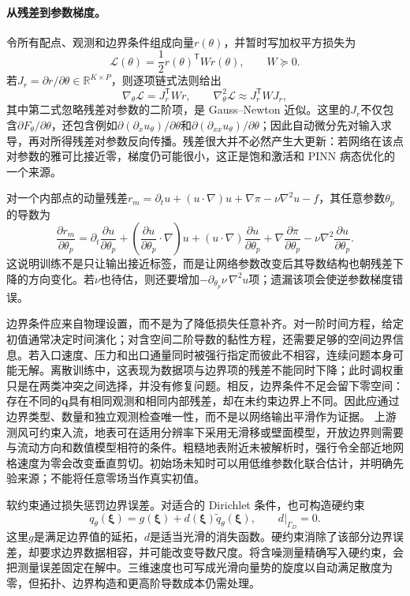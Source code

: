 \paragraph{从残差到参数梯度。}
令所有配点、观测和边界条件组成向量$r(\theta)$，并暂时写加权平方损失为
\[
\mathcal L(\theta)=\frac12 r(\theta)^{\mathsf T}Wr(\theta),\qquad W\succeq0.
\]
若$J_r=\partial r/\partial\theta\in\mathbb R^{K\times P}$，则逐项链式法则给出
\[
\nabla_\theta\mathcal L=J_r^{\mathsf T}Wr,
\qquad
\nabla_\theta^2\mathcal L\approx J_r^{\mathsf T}WJ_r,
\]
其中第二式忽略残差对参数的二阶项，是 Gauss--Newton 近似。这里的$J_r$不仅包含$\partial F_\theta/\partial\theta$，还包含例如$\partial(\partial_xu_\theta)/\partial\theta$和$\partial(\partial_{xx}u_\theta)/\partial\theta$；因此自动微分先对输入求导，再对所得残差对参数反向传播。残差很大并不必然产生大更新：若网络在该点对参数的雅可比接近零，梯度仍可能很小，这正是饱和激活和 PINN 病态优化的一个来源。

对一个内部点的动量残差$r_m=\partial_tu+(u\cdot\nabla)u+\nabla\pi-\nu\nabla^2u-f$，其任意参数$\theta_p$的导数为
\[
\frac{\partial r_m}{\partial\theta_p}=\partial_t\frac{\partial u}{\partial\theta_p}
+\left(\frac{\partial u}{\partial\theta_p}\cdot\nabla\right)u
+(u\cdot\nabla)\frac{\partial u}{\partial\theta_p}
+\nabla\frac{\partial\pi}{\partial\theta_p}
-\nu\nabla^2\frac{\partial u}{\partial\theta_p}.
\]
这说明训练不是只让输出接近标签，而是让网络参数改变后其导数结构也朝残差下降的方向变化。若$\nu$也待估，则还要增加$-\partial_{\theta_p}\nu\,\nabla^2u$项；遗漏该项会使逆参数梯度错误。

边界条件应来自物理设置，而不是为了降低损失任意补齐。对一阶时间方程，给定初值通常决定时间演化；对含空间二阶导数的黏性方程，还需要足够的空间边界信息。若入口速度、压力和出口通量同时被强行指定而彼此不相容，连续问题本身可能无解。离散训练中，这表现为数据项与边界项的残差不能同时下降；此时调权重只是在两类冲突之间选择，并没有修复问题。相反，边界条件不足会留下零空间：存在不同的$\mathbf q$具有相同观测和相同内部残差，却在未约束边界上不同。因此应通过边界类型、数量和独立观测检查唯一性，而不是以网络输出平滑作为证据。
上游测风可约束入流，地表可在适用分辨率下采用无滑移或壁面模型，开放边界则需要与流动方向和数值模型相符的条件。粗糙地表附近未被解析时，强行令全部近地网格速度为零会改变垂直剪切。初始场未知时可以用低维参数化联合估计，并明确先验来源；不能将任意零场当作真实初值。

软约束通过损失惩罚边界误差。对适合的 Dirichlet 条件，也可构造硬约束
\begin{equation}
 q_\theta(\boldsymbol\xi)=g(\boldsymbol\xi)
 +d(\boldsymbol\xi)\widetilde q_\theta(\boldsymbol\xi),
 \qquad d|_{\Gamma_D}=0.
\end{equation}
这里$g$是满足边界值的延拓，$d$是适当光滑的消失函数。硬约束消除了该部分边界误差，却要求边界数据相容，并可能改变导数尺度。将含噪测量精确写入硬约束，会把测量误差固定在解中。三维速度也可写成光滑向量势的旋度以自动满足散度为零，但拓扑、边界构造和更高阶导数成本仍需处理。

